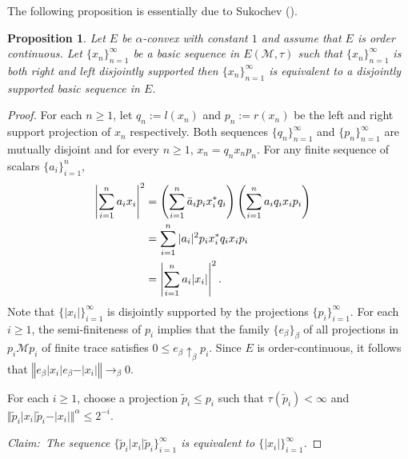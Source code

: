 \documentclass[12pt]{amsart}
\let\cal\mathcal
\newtheorem{proposition}[theorem]{Proposition}
\def\m{{\cal M}}
\numberwithin{equation}{section}
\numberwithin{theorem}{section}
\begin{document}
\smallskip

The following proposition is essentially due to Sukochev
(\cite{SU}).
\begin{proposition}\label{disjoint}
Let $E$ be $\alpha$-convex with constant $1$ and assume that
$E$ is order continuous.
Let $\{x_{n}\}_{n=1}^\infty$ be a basic sequence in $E(\m, \tau)$ such that
$\{x_{n}\}_{n=1}^\infty$ is both right and left disjointly supported then
$\{x_{n}\}_{n=1}^\infty$ is equivalent to a disjointly supported
 basic sequence in $E$.
\end{proposition}
\begin{proof} For each $n\geq 1$, 
let $q_{n} := l(x_{n})$ and $p_{n} := r(x_{n})$ be the left and right
support projection of $x_{n}$ respectively. Both sequences
$\{q_{n}\}_{n=1}^\infty$ and $\{p_{n}\}_{n=1}^\infty$ are mutually disjoint  and for every
$n\geq 1$,  $x_{n} = q_{n} x_{n}
p_{n}$.  For any finite sequence of scalars $\{a_i\}_{i=1}^n$,
\begin{equation*}
\begin{split}
\left\vert \sum^{n}_{i=1} a_{i} x_{i} \right\vert^{2} &=\left( \sum^{n}_{i=1}
\bar{a}_{i} p_{i} x_{i}^{*} q_{i} \right) \left( \sum^{n}_{i=1} a_{i} q_{i}
x_{i} p_{i} \right) \cr
&= \sum^{n}_{i=1} \vert a_{i} \vert^{2} p_{i} x_{i}^{\ast} q_{i} x_{i}
p_{i} \cr
&= \left\vert \sum_{i=1}^n a_{i} \vert x_{i} \vert \right\vert^{2}.
\end{split}
\end{equation*}
Note that $\{\vert x_{i} \vert\}_{i=1}^\infty$ is disjointly supported by the
projections $\{p_{i}\}_{i=1}^\infty$. For each $i\geq 1$,
the semi-finiteness of $p_{i}$ implies that the  family $\{e_\beta\}_\beta$ of all
projections in $p_i\m p_i$ of finite trace  satisfies
$0\leq e_\beta \uparrow_\beta p_i$. Since $E$ is order-continuous, it
follows that 
$\left\Vert e_\beta \vert x_i \vert e_\beta 
- \vert x_i \vert \right\Vert \rightarrow_\beta 0$.

For each $i \geq 1$, choose a projection $\tilde{p}_{i} \leq p_{i}$ such
that $\tau(\tilde{p}_{i}) < \infty$ and 
$\Vert \tilde{p}_{i} \vert
x_{i} \vert \tilde{p}_{i} - \vert x_{i} \vert \Vert^\alpha \leq 2^{-i}$. 


\noindent 
{\it Claim:\ The sequence 
 $\{\tilde{p}_{i} \vert x_{i} \vert \tilde{p}_{i}\}_{i=1}^\infty$ is
equivalent to $\{\vert x_{i} \vert\}_{i=1}^\infty$.} 


\end{proof}
\end{document}
